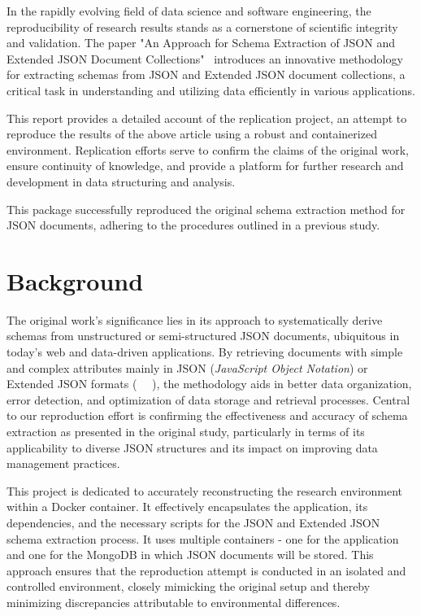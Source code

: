 \documentclass[sigconf, nonacm]{acmart}
\begin{document}
In the rapidly evolving field of data science and software engineering, the reproducibility of research results stands as a cornerstone of scientific integrity and validation. The paper "An Approach for Schema Extraction of JSON and Extended JSON Document Collections"~\cite{JsonSchemaDiscovery} introduces an innovative methodology for extracting schemas from JSON and Extended JSON document collections, a critical task in understanding and utilizing data efficiently in various applications.

This report provides a detailed account of the replication project, an attempt to reproduce the results of the above article using a robust and containerized environment. Replication efforts serve to confirm the claims of the original work, ensure continuity of knowledge, and provide a platform for further research and development in data structuring and analysis.

This package successfully reproduced the original schema extraction method for JSON documents, adhering to the procedures outlined in a previous study.

\section{Background}

The original work’s significance lies in its approach to systematically derive schemas from unstructured or semi-structured JSON documents, ubiquitous in today’s web and data-driven applications. By retrieving documents with simple and complex attributes mainly in JSON (\textit{JavaScript Object Notation}) or Extended JSON formats (~\cite{6106531} ~\cite{7592700}), the methodology aids in better data organization, error detection, and optimization of data storage and retrieval processes. Central to our reproduction effort is confirming the effectiveness and accuracy of schema extraction as presented in the original study, particularly in terms of its applicability to diverse JSON structures and its impact on improving data management practices.

This project is dedicated to accurately reconstructing the research environment within a Docker container. It effectively encapsulates the application, its dependencies, and the necessary scripts for the JSON and Extended JSON schema extraction process. It uses multiple containers - one for the application and one for the MongoDB in which JSON documents will be stored. This approach ensures that the reproduction attempt is conducted in an isolated and controlled environment, closely mimicking the original setup and thereby minimizing discrepancies attributable to environmental differences. 
\end{document}
